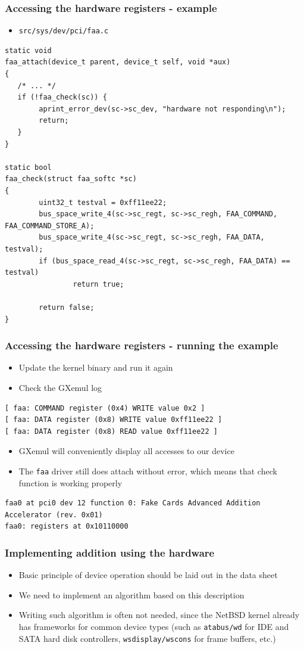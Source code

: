 \documentclass[dvipsnames,table]{beamer}
\begin{document}
\begin{frame}[fragile]
\frametitle{Accessing the hardware registers - example}
\begin{itemize}
	\item {\tt src/sys/dev/pci/faa.c}
\end{itemize}
\begin{lstlisting}
static void
faa_attach(device_t parent, device_t self, void *aux)
{
   /* ... */
   if (!faa_check(sc)) {
   		aprint_error_dev(sc->sc_dev, "hardware not responding\n");
        return;
   }
}

static bool
faa_check(struct faa_softc *sc)
{
        uint32_t testval = 0xff11ee22; 
        bus_space_write_4(sc->sc_regt, sc->sc_regh, FAA_COMMAND, FAA_COMMAND_STORE_A);
        bus_space_write_4(sc->sc_regt, sc->sc_regh, FAA_DATA, testval);
        if (bus_space_read_4(sc->sc_regt, sc->sc_regh, FAA_DATA) == testval)
                return true;

        return false;
}
\end{lstlisting}
\end{frame}

\begin{frame}[fragile]
\frametitle{Accessing the hardware registers - running the example}
\begin{itemize}
	\item Update the kernel binary and run it again
	\item Check the GXemul log
\end{itemize}
\begin{verbatim}
[ faa: COMMAND register (0x4) WRITE value 0x2 ]
[ faa: DATA register (0x8) WRITE value 0xff11ee22 ]
[ faa: DATA register (0x8) READ value 0xff11ee22 ]
\end{verbatim}
\begin{itemize}
	\item GXemul will conveniently display all accesses to our device
	\item The {\tt faa} driver still does attach without error, which means that check function is working properly
\end{itemize}
\tiny
\begin{verbatim}
faa0 at pci0 dev 12 function 0: Fake Cards Advanced Addition Accelerator (rev. 0x01)
faa0: registers at 0x10110000
\end{verbatim}
\end{frame}

\begin{frame}
\frametitle{Implementing addition using the hardware}
\begin{itemize}
	\item Basic principle of device operation should be laid out in the data sheet	
	\item We need to implement an algorithm based on this description \hyperlink{faaop}{}
	\item Writing such algorithm is often not needed, since the NetBSD kernel already has frameworks for common device types (such as {\tt atabus/wd} for IDE and SATA hard disk controllers, {\tt wsdisplay/wscons} for frame buffers, etc.)
\end{itemize}
\end{frame}
\end{document}
